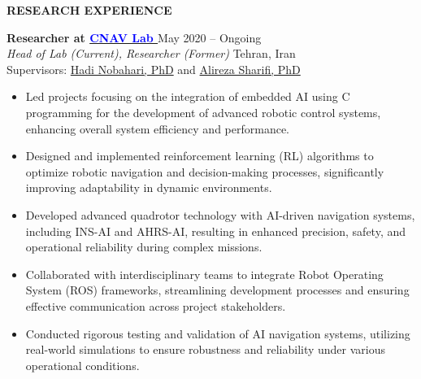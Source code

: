 \documentclass[12pt]{article}
\begin{document}
\vspace{0.2in} %


\newpage
\begin{center}
	{\noindent \bfseries RESEARCH EXPERIENCE} %
\end{center} 

\vspace{8pt} %

\noindent
{\bfseries Researcher at
\href{https://www.linkedin.com/company/cnav-lab/}{\textcolor{blue}{CNAV Lab \faLinkedin}} \href{https://github.com/CNAVLAB}{\faGithub}
\textcolor{red}{
\href{https://youtube.com/@cnavlab?si=Fc-Y3oyKdgAmz3-5}{\faYoutube}}
} \hfill May 2020 -- Ongoing \\ 
\noindent \textit{Head of Lab (Current), Researcher (Former) }
\hfill Tehran, Iran \\ 
\noindent Supervisors: 
\href{https://ae.sharif.edu/~portal/faculty/1091235256}{Hadi Nobahari, PhD} and
\href{https://ae.sharif.edu/~portal/faculty/1730782165}{Alireza Sharifi, PhD}

\begin{itemize} \itemsep -4pt %
    \item Led projects focusing on the integration of embedded AI using C programming for the development of advanced robotic control systems, enhancing overall system efficiency and performance.
    \item Designed and implemented reinforcement learning (RL) algorithms to optimize robotic navigation and decision-making processes, significantly improving adaptability in dynamic environments.
    \item Developed advanced quadrotor technology with AI-driven navigation systems, including INS-AI and AHRS-AI, resulting in enhanced precision, safety, and operational reliability during complex missions.
    \item Collaborated with interdisciplinary teams to integrate Robot Operating System (ROS) frameworks, streamlining development processes and ensuring effective communication across project stakeholders.
    \item Conducted rigorous testing and validation of AI navigation systems, utilizing real-world simulations to ensure robustness and reliability under various operational conditions.
\end{itemize}
\end{document}
